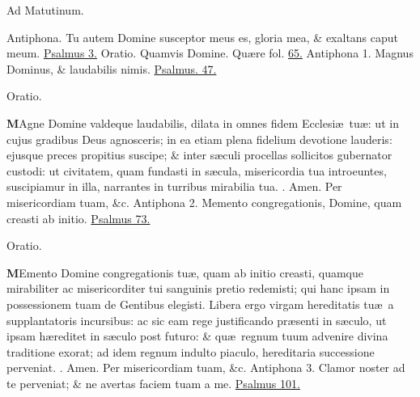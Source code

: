 \documentclass[letter,11pt]{book}
\makeatletter
\DeclareRobustCommand{\Rbar}{\vers@resp{0pt}{R}}
\newcommand{\vers@resp@sym}{\raisebox{0.2ex}{\rotatebox[origin=c]{-20}{$\m@th\rceil$}}}
\newcommand{\vers@resp}[2]{%
  {\ooalign{\hidewidth\kern#1\vers@resp@sym\hidewidth\cr#2\cr}}%
}%
\def\R{\color{Red} \Rbar . \color{black}}
\makeatother
\begin{document}
\begin{multicols*}{2}
\begin{center}
\color{Red} Ad Matutinum.
\end{center}
\vspace{-.75em}
\par \noindent \color{Red} Antiphona. \color{black} Tu autem Domine susceptor meus es, gloria mea, \& exaltans caput meum. \color{Red} \hyperlink{ps3}{Psalmus 3.} \color{black}
\newline \color{Red} Oratio. \color{black} Quamvis Domine. \color{Red} Qu\ae re fol. \color{black} \hyperlink{page.65}{65.}
\newline \color{Red} Antiphona 1. \color{black} Magnus Dominus, \& laudabilis nimis. \color{Red} \hyperlink{ps47}{Psalmus. 47.} \color{black}
\vspace{-.5em} \begin{center} \color{Red} Oratio. \color{black} \end{center} \vspace{-.5em}
\lettrine[lines=2]{\bfseries \color{Red} M}{}Agne Domine valdeque laudabilis, dilata in omnes fidem Ecclesi\ae \ tu\ae : ut in cujus gradibus Deus agnosceris; in ea etiam plena fidelium devotione lauderis: ejusque preces propitius suscipe; \& inter s\ae culi procellas sollicitos gubernator custodi: ut civitatem, quam fundasti in s\ae cula, misericordia tua introeuntes, suscipiamur in illa, narrantes in turribus mirabilia tua. \R Amen. Per misericordiam tuam, \&c.
\newline \color{Red} Antiphona 2. \color{black} Memento congregationis, Domine, quam creasti ab initio. \color{Red} \hyperlink{ps73}{Psalmus 73.} \color{black}
\vspace{-.5em} \begin{center} \color{Red} Oratio. \color{black} \end{center} \vspace{-.5em}
\lettrine[lines=2]{\bfseries \color{Red} M}{}Emento Domine congregationis tu\ae , quam ab initio creasti, quamque mirabiliter ac misericorditer tui sanguinis pretio redemisti; qui hanc ipsam in possessionem tuam de Gentibus elegisti. Libera ergo virgam hereditatis tu\ae \ a supplantatoris incursibus: ac sic eam rege justificando pr\ae senti in s\ae culo, ut ipsam h\ae reditet in s\ae culo post futuro: \& qu\ae \ regnum tuum advenire divina traditione exorat; ad idem regnum indulto piaculo, hereditaria successione perveniat. \R Amen. Per misericordiam tuam, \&c.
\newline \color{Red} Antiphona 3. \color{black} Clamor noster ad te perveniat; \& ne avertas faciem tuam a me. \color{Red} \hyperlink{ps101}{Psalmus 101.} \color{black}

\end{multicols*}
\end{document}
